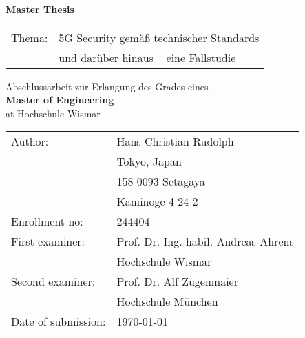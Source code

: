 \begin{titlepage}
\centering

\vspace*{3cm}

{
    \Huge{
        \textbf{Master Thesis}
    }
}

\vspace{2cm}

\begin{table}[h!]
\centering
\LARGE
\begin{tabular}{ll}
Thema:         & 5G Security gemäß technischer Standards\\
               & und darüber hinaus -- eine Fallstudie
\end{tabular}
\end{table}

\vspace{2cm}

\large{
    Abschlussarbeit zur Erlangung des Grades eines\\\vspace{2mm}
    \textbf{Master of Engineering}\\\vspace{2mm}
    at Hochschule Wismar
}

\vfill
{
    \renewcommand{\arraystretch}{1.1}
    {

    \begin{table}[h!]
    \centering
    \large
    \begin{tabular}{ll}
    Author:             & Hans Christian Rudolph               \\
                        & Tokyo, Japan                         \\
                        & 158-0093 Setagaya                    \\
                        & Kaminoge 4-24-2                      \vspace{3mm}\\
    Enrollment no:      & 244404                               \\
    First examiner:     & Prof. Dr.-Ing. habil. Andreas Ahrens \\
                        & Hochschule Wismar                    \\
    Second examiner:    & Prof. Dr. Alf Zugenmaier             \vspace{3mm}\\
                        & Hochschule München                   \\
    Date of submission: & \today
    \end{tabular}
    \end{table}
    }
}

\vspace{2cm}

\end{titlepage}
